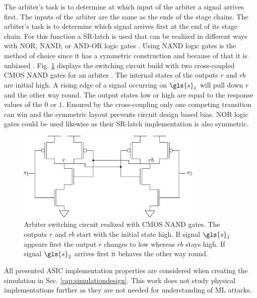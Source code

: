 The arbiter's task is to determine at which input of the arbiter a signal arrives first.
The inputs of the arbiter are the same as the ends of the stage chains.
The arbiter's task is to determine which signal arrives first at the end of its stage chain.
For this function a \ac{SR-latch} is used that can be realized in different ways with NOR, NAND, or AND-OR logic gates \cite{2016Flip-flopWikipedia}.
Using NAND logic gates is the method of choice since it has a symmetric construction and because of that it is unbiased \cite{Lin2010Low-powerFunctions, Maes2013PhysicallyApplications.}.
Fig. \ref{fig:nandarbiter} displays the switching circuit build with two cross-coupled \ac{CMOS} NAND gates for an arbiter \cite{2016NANDWikipedia}.
The internal states of the outputs $r$ and $rb$ are initial high. 
A rising edge of a signal occurring on $\gls{s}_1$ will pull down $r$ and the other way round.
The output states low or high are equal to the response values of the \puf $0$ or $1$.
Ensured by the cross-coupling only one competing transition can win and the symmetric layout prevents circuit design based bias.
NOR logic gates could be used likewise as their \ac{SR-latch} implementation is also symmetric.

\begin{figure}[ht]
\centering
\includegraphics[width=0.80\textwidth]{images/arbiter_circuit.eps}
\caption[Arbiter circuit]{Arbiter switching circuit realized with \ac{CMOS} NAND gates. The outputs $r$ and $rb$ start with the initial state high. If signal $\gls{s}_1$ appears first the output $r$ changes to low whereas $rb$ stays high. If signal $\gls{s}_2$ arrives first it behaves the other way round.}
\label{fig:nandarbiter}
\end{figure}

All presented \apuf \ac{ASIC} implementation properties are considered when creating the \apuf simulation in Sec. \ref{cap:simulationdesign}.
This work does not study physical \apuf implementations further as they are not needed for understanding of \ac{ML} attacks.

